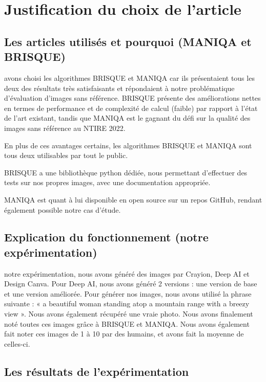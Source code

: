 \documentclass{ieeeaccess}
\begin{document}
\section{Justification du choix de l'article}

\subsection{Les articles utilisés et pourquoi (MANIQA et BRISQUE)}

 avons choisi les algorithmes BRISQUE et MANIQA car ils présentaient tous les deux des résultats très satisfaisants et répondaient à notre problématique d’évaluation d’images sans référence. BRISQUE présente des améliorations nettes en termes de performance et de complexité de calcul (faible) par rapport à l’état de l’art existant, tandis que MANIQA est le gagnant du défi sur la qualité des images sans référence au NTIRE 2022.  

En plus de ces avantages certains, les algorithmes BRISQUE et MANIQA sont tous deux utilisables par tout le public.  

BRISQUE a une bibliothèque python dédiée, nous permettant d’effectuer des tests sur nos propres images, avec une documentation appropriée. 

MANIQA est quant à lui disponible en open source sur un repos GitHub, rendant également possible notre cas d’étude.   

\subsection{Explication du fonctionnement (notre expérimentation)}

 notre expérimentation, nous avons généré des images par Crayion, Deep AI et Design Canva. Pour Deep AI, nous avons généré 2 versions : une version de base et une version améliorée. Pour générer nos images, nous avons utilisé la phrase suivante : « a beautiful woman standing atop a mountain range with a breezy view ». Nous avons également récupéré une vraie photo. Nous avons finalement noté toutes ces images grâce à BRISQUE et MANIQA. Nous avons également fait noter ces images de 1 à 10 par des humains, et avons fait la moyenne de celles-ci.

\subsection{Les résultats de l'expérimentation}
\end{document}
